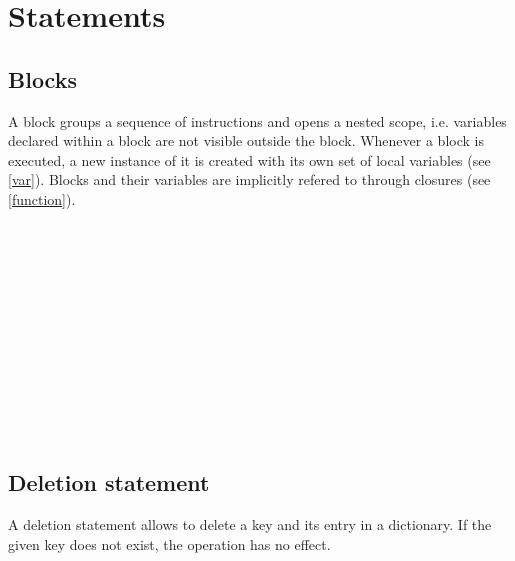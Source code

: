 \chapter{Statements}

\section{Blocks}

A block groups a sequence of instructions and opens a nested scope,
i.e. variables declared within a block are not visible outside the
block. Whenever a block is executed, a new instance of it is created
with its own set of local variables (see \ref{var}). Blocks and
their variables are implicitly refered to through closures
(see \ref{function}).

\begin{grammar}
      \produces \lextoken{\{} \lextoken{\}} \\
      \produces \lextoken{\{}  \lextoken{\}} \\
      \produces {} \\
      \produces {}  \\
      \produces {} \lextoken{;} \\
      \produces {} \lextoken{;} \\
      \produces {} \\
      \produces {} \\
      \produces {} \\
      \produces {} \lextoken{;} \\
      \produces {} \lextoken{;} \\
\end{grammar}

\section{Deletion statement}

A deletion statement allows to delete a key and its entry
in a dictionary. If the given key does not exist, the operation
has no effect.

\begin{grammar}
      \produces {} 
\end{grammar}

